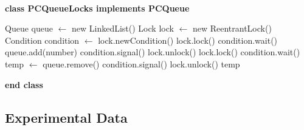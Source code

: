 \documentclass[14pt]{article}
\begin{document}
\vspace{2.5 mm}
\\\textbf{class PCQueueLocks implements PCQueue}
\begin{algorithmic}
\State Queue queue $\gets$ new LinkedList()
\State Lock lock $\gets$ new ReentrantLock()
\State Condition condition $\gets$ lock.newCondition()
    \State lock.lock()
        \State condition.wait()
    \EndWhile
    \State queue.add(number)
    \State condition.signal()
    \State lock.unlock()
\EndFunction
\vspace{1 mm}
    \State lock.lock()
        \State condition.wait()
    \EndWhile
    \State temp $\gets$ queue.remove()
    \State condition.signal()
    \State lock.unlock()
    \State \Return temp
\EndFunction
\end{algorithmic}
\textbf{end class}
\subsection{Experimental Data}
\end{document}
